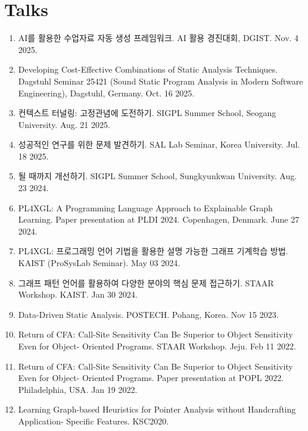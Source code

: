 \documentclass[letterpaper,11pt]{article}
\begin{document}
\section{Talks}

\begin{enumerate}
  \item{AI를 활용한 수업자료 자동 생성 프레임워크. AI 활용 경진대회, DGIST. Nov. 4 2025.}

  \item{Developing Cost-Effective Combinations of Static Analysis Techniques. Dagstuhl Seminar 25421 (Sound Static Program Analysis in Modern Software Engineering), Dagstuhl, Germany. Oct. 16 2025.}

  \item{컨텍스트 터널링: 고정관념에 도전하기. SIGPL Summer School, Seogang University. Aug. 21 2025.}

  \item{성공적인 연구를 위한 문제 발견하기. SAL Lab Seminar, Korea University. Jul. 18 2025.}

  \item{될 때까지 개선하기. SIGPL Summer School, Sungkyunkwan University. Aug. 23 2024.}

  \item{PL4XGL: A Programming Language Approach to Explainable Graph Learning. Paper presentation at PLDI 2024. Copenhagen, Denmark. June 27 2024.}
  
  \item{PL4XGL: 프로그래밍 언어 기법을 활용한 설명 가능한 그래프 기계학습 방법. KAIST (ProSysLab Seminar). May 03 2024.}
  
  \item{그래프 패턴 언어를 활용하여 다양한 분야의 핵심 문제 접근하기. STAAR Workshop. KAIST. Jan 30 2024.}

  \item{Data-Driven Static Analysis. POSTECH. Pohang, Korea. Nov 15 2023.}

  \item{Return of CFA: Call-Site Sensitivity Can Be Superior to Object Sensitivity Even for Object- Oriented Programs. STAAR Workshop. Jeju. Feb 11 2022.}

  \item{Return of CFA: Call-Site Sensitivity Can Be Superior to Object Sensitivity Even for Object- Oriented Programs. Paper presentation at POPL 2022. Philadelphia,  USA. Jan 19 2022.}
 
  \item{Learning Graph-based Heuristics for Pointer Analysis without Handcrafting Application- Specific Features. KSC2020.}
 

\end{enumerate}
\end{document}

